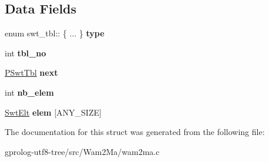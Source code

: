 \subsection*{Data Fields}
\begin{DoxyCompactItemize}
\item 
enum swt\+\_\+tbl\+:: \{ ... \}  {\bfseries type}\hypertarget{structswt__tbl_a6b1e4dc1e07f951ebe6ea23a9567e0ca}{}\label{structswt__tbl_a6b1e4dc1e07f951ebe6ea23a9567e0ca}

\item 
int {\bfseries tbl\+\_\+no}\hypertarget{structswt__tbl_a83f05356288e3c0f11cf0539a4a64eaa}{}\label{structswt__tbl_a83f05356288e3c0f11cf0539a4a64eaa}

\item 
\hyperlink{structswt__tbl}{P\+Swt\+Tbl} {\bfseries next}\hypertarget{structswt__tbl_aed3e3921525480876c83cfab6c82ae3b}{}\label{structswt__tbl_aed3e3921525480876c83cfab6c82ae3b}

\item 
int {\bfseries nb\+\_\+elem}\hypertarget{structswt__tbl_a1f108cb255f34e0e43fd548bdeaa2a3e}{}\label{structswt__tbl_a1f108cb255f34e0e43fd548bdeaa2a3e}

\item 
\hyperlink{structswt__elt}{Swt\+Elt} {\bfseries elem} \mbox{[}A\+N\+Y\+\_\+\+S\+I\+ZE\mbox{]}\hypertarget{structswt__tbl_aef5072704a328212e05d40837fe665d0}{}\label{structswt__tbl_aef5072704a328212e05d40837fe665d0}

\end{DoxyCompactItemize}


The documentation for this struct was generated from the following file\+:\begin{DoxyCompactItemize}
\item 
gprolog-\/utf8-\/tree/src/\+Wam2\+Ma/wam2ma.\+c\end{DoxyCompactItemize}
